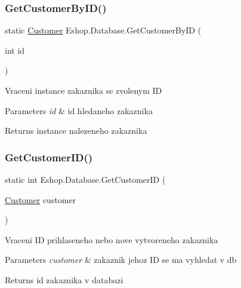 \subsubsection{\texorpdfstring{GetCustomerByID()}{GetCustomerByID()}}
{\footnotesize\ttfamily static \mbox{\hyperlink{class_eshop_1_1_customer}{Customer}} Eshop.\+Database.\+Get\+Customer\+By\+ID (\begin{DoxyParamCaption}\item[{int}]{id }\end{DoxyParamCaption})\hspace{0.3cm}{\ttfamily [static]}}



Vraceni instance zakaznika se zvolenym ID 


\begin{DoxyParams}{Parameters}
{\em id} & id hledaneho zakaznika\\
\hline
\end{DoxyParams}
\begin{DoxyReturn}{Returns}
instance nalezeneho zakaznika
\end{DoxyReturn}
\mbox{\label{class_eshop_1_1_database_a4f6bab0fe88f9bd59f31acddd5aaa0e9}} 
\subsubsection{\texorpdfstring{GetCustomerID()}{GetCustomerID()}}
{\footnotesize\ttfamily static int Eshop.\+Database.\+Get\+Customer\+ID (\begin{DoxyParamCaption}\item[{\mbox{\hyperlink{class_eshop_1_1_customer}{Customer}}}]{customer }\end{DoxyParamCaption})\hspace{0.3cm}{\ttfamily [static]}}



Vraceni ID prihlaseneho nebo nove vytvoreneho zakaznika 


\begin{DoxyParams}{Parameters}
{\em customer} & zakaznik jehoz ID se ma vyhledat v db\\
\hline
\end{DoxyParams}
\begin{DoxyReturn}{Returns}
id zakaznika v databazi
\end{DoxyReturn}
\mbox{\label{class_eshop_1_1_database_a0e0919b49fd17301bfb70453552948b6}} 
